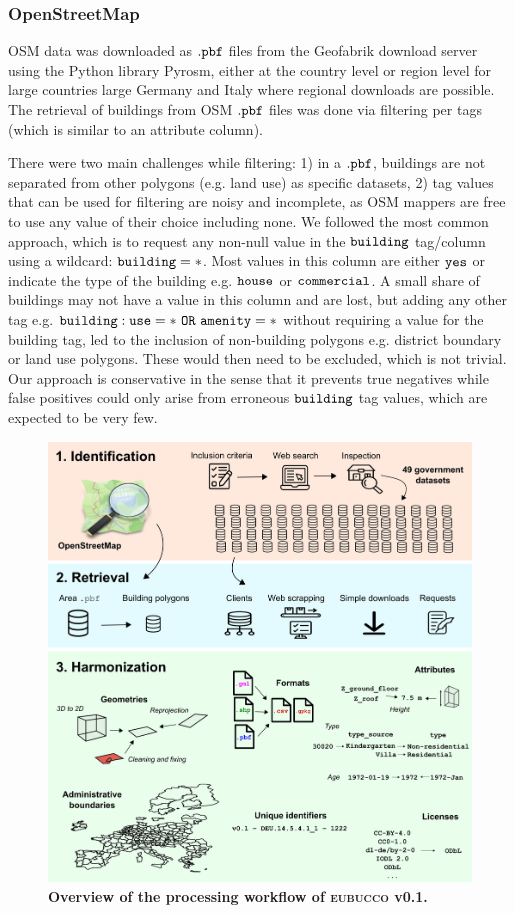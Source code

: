 \documentclass[fleqn,10pt]{wlscirep}
\begin{document}
\subsubsection*{OpenStreetMap}

OSM data was downloaded as $\tt{.pbf}$ files from the Geofabrik download server using the Python library Pyrosm, either at the country level or region level for large countries large Germany and Italy where regional downloads are possible. The retrieval of buildings from OSM $\tt{.pbf}$ files was done via filtering per tags (which is similar to an attribute column). 

There were two main challenges while filtering: 1) in a $\tt{.pbf}$, buildings are not separated from other polygons (e.g. land use) as specific datasets, 2) tag values that can be used for filtering are noisy and incomplete, as OSM mappers are free to use any value of their choice including none. We followed the most common approach, which is to request any non-null value in the $\tt{building}$ tag/column using a wildcard: $\tt{building=*}$. Most values in this column are either $\tt{yes}$ or indicate the type of the building e.g. $\tt{house}$ or $\tt{commercial}$. A small share of buildings may not have a value in this column and are lost, but adding any other tag e.g. $\tt{building:use=* \ OR \ amenity=*}$ without requiring a value for the building tag, led to the inclusion of non-building polygons e.g. district boundary or land use polygons. These would then need to be excluded, which is not trivial. Our approach is conservative in the sense that it prevents true negatives while false positives could only arise from erroneous $\tt{building}$ tag values, which are expected to be very few.     

\begin{figure}[h!]
\centering
\includegraphics[width=\linewidth]{figs/methods_no_valid.png}
\caption{\textbf{Overview of the processing workflow of \textsc{eubucco} v0.1.}}
\label{fig:methods}
\end{figure}
\end{document}
